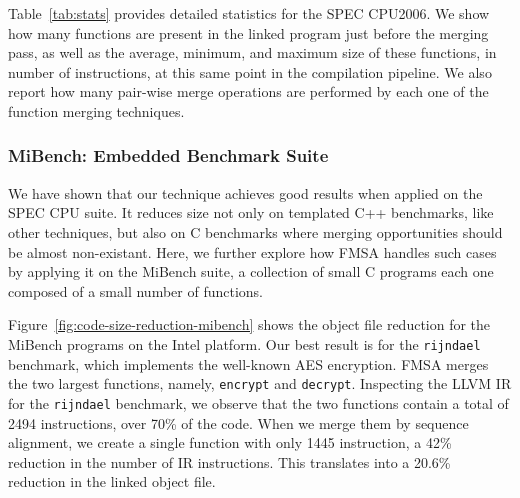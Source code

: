 Table~\ref{tab:stats} provides detailed statistics for the SPEC CPU2006.
We show how many functions are present in the linked program
just before the merging pass, as well as
the average, minimum, and maximum size of these functions, in number of instructions, at
this same point in the compilation pipeline.
We also report how many pair-wise merge operations are
performed by each one of the function merging techniques.

\subsubsection*{MiBench: Embedded Benchmark Suite}

We have shown that our technique achieves good results when applied on the SPEC
CPU suite. It reduces size not only on templated C++ benchmarks, like other
techniques, but also on C benchmarks where merging opportunities should
be almost non-existant. Here, we further explore how FMSA handles such
cases by applying it on the MiBench suite, a collection of small C programs
each one composed of a small number of functions. 

Figure~\ref{fig:code-size-reduction-mibench} shows the object file reduction
for the MiBench programs on the Intel platform. Our best result is for the \texttt{rijndael} benchmark,
which implements the well-known AES encryption. FMSA merges the two largest functions, namely,
\texttt{encrypt} and \texttt{decrypt}.
Inspecting the LLVM IR for the \texttt{rijndael} benchmark, we observe that
the two functions contain a total of 2494 instructions, over 70\% of the code.
When we merge them by sequence alignment, we create a single function with
only 1445 instruction, a 42\% reduction in the number of IR instructions. This
translates into a 20.6\% reduction in the linked object file.


